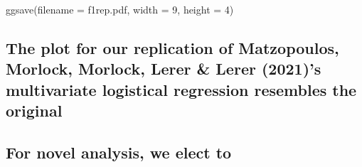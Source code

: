 \documentclass[
]{article}
\newenvironment{Shaded}{\begin{snugshade}}{\end{snugshade}}
\newcommand{\AttributeTok}[1]{\textcolor[rgb]{0.77,0.63,0.00}{#1}}
\newcommand{\DecValTok}[1]{\textcolor[rgb]{0.00,0.00,0.81}{#1}}
\newcommand{\FunctionTok}[1]{\textcolor[rgb]{0.00,0.00,0.00}{#1}}
\newcommand{\NormalTok}[1]{#1}
\newcommand{\StringTok}[1]{\textcolor[rgb]{0.31,0.60,0.02}{#1}}
\begin{document}
\begin{Shaded}
\begin{Highlighting}[]
\FunctionTok{ggsave}\NormalTok{(}\AttributeTok{filename =} \StringTok{\textquotesingle{}f1rep.pdf\textquotesingle{}}\NormalTok{, }\AttributeTok{width =} \DecValTok{9}\NormalTok{, }\AttributeTok{height =} \DecValTok{4}\NormalTok{)}
\end{Highlighting}
\end{Shaded}

\hypertarget{the-plot-for-our-replication-of-matzopoulos-morlock-morlock-lerer-lerer-2021s-multivariate-logistical-regression-resembles-the-original}{%
\subsection{The plot for our replication of Matzopoulos, Morlock,
Morlock, Lerer \& Lerer (2021)'s multivariate logistical regression
resembles the
original}\label{the-plot-for-our-replication-of-matzopoulos-morlock-morlock-lerer-lerer-2021s-multivariate-logistical-regression-resembles-the-original}}

\hypertarget{for-novel-analysis-we-elect-to}{%
\subsection{For novel analysis, we elect
to}\label{for-novel-analysis-we-elect-to}}
\end{document}
